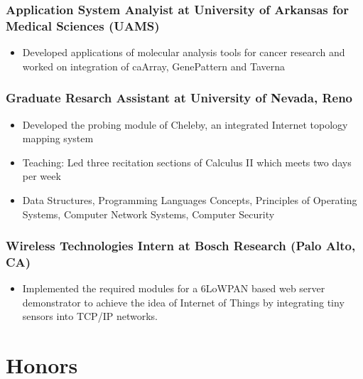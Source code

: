 \documentclass[11pt, letter]{article}
\begin{document}
\begin{raggedright}
\subsubsection{Application System Analyist at University of Arkansas for
Medical Sciences
(UAMS)}\label{application-system-analyist-at-university-of-arkansas-for-medical-sciences-uams}

\begin{itemize}
\itemsep1pt\parskip0pt
\item
  Developed applications of molecular analysis tools for cancer research
  and worked on integration of caArray, GenePattern and Taverna
\end{itemize}

\subsubsection{Graduate Resarch Assistant at University of Nevada,
Reno}\label{graduate-resarch-assistant-at-university-of-nevada-reno}

\begin{itemize}
\itemsep1pt\parskip0pt
\item
  Developed the probing module of Cheleby, an integrated Internet
  topology mapping system
\item
  Teaching: Led three recitation sections of Calculus II which meets two
  days per week
\item
  Data Structures, Programming Languages Concepts, Principles of
  Operating Systems, Computer Network Systems, Computer Security
\end{itemize}

\subsubsection{Wireless Technologies Intern at Bosch Research (Palo
Alto,
CA)}\label{wireless-technologies-intern-at-bosch-research-palo-alto-ca}

\begin{itemize}
\itemsep1pt\parskip0pt
\item
  Implemented the required modules for a 6LoWPAN based web server
  demonstrator to achieve the idea of Internet of Things by integrating
  tiny sensors into TCP/IP networks.
\end{itemize}

\section{Honors}\label{honors}


\end{raggedright}
\end{document}
